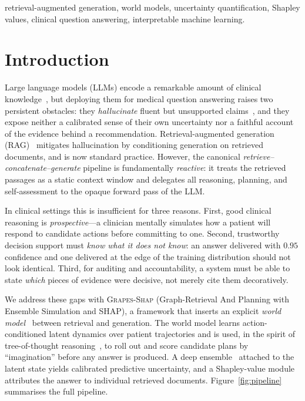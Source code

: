 \documentclass[conference]{IEEEtran}
\newcommand{\method}{\textsc{Grapes-Shap}}
\begin{document}
\begin{IEEEkeywords}
retrieval-augmented generation, world models, uncertainty quantification,
Shapley values, clinical question answering, interpretable machine learning.
\end{IEEEkeywords}

\section{Introduction}
Large language models (LLMs) encode a remarkable amount of clinical
knowledge~\cite{singhal2023medpalm}, but deploying them for medical question
answering raises two persistent obstacles: they \emph{hallucinate} fluent
but unsupported claims~\cite{ji2023hallucination}, and they expose neither a
calibrated sense of their own uncertainty nor a faithful account of the
evidence behind a recommendation. Retrieval-augmented generation
(RAG)~\cite{lewis2020rag} mitigates hallucination by conditioning generation
on retrieved documents, and is now standard practice. However, the canonical
\emph{retrieve--concatenate--generate} pipeline is fundamentally
\emph{reactive}: it treats the retrieved passages as a static context window
and delegates all reasoning, planning, and self-assessment to the opaque
forward pass of the LLM.

In clinical settings this is insufficient for three reasons. First, good
clinical reasoning is \emph{prospective}---a clinician mentally simulates how
a patient will respond to candidate actions before committing to one. Second,
trustworthy decision support must \emph{know what it does not know}: an answer
delivered with $0.95$ confidence and one delivered at the edge of the
training distribution should not look identical. Third, for auditing and
accountability, a system must be able to state \emph{which} pieces of evidence
were decisive, not merely cite them decoratively.

We address these gaps with \method{} (Graph-Retrieval And Planning with
Ensemble Simulation and SHAP), a framework that inserts an explicit
\emph{world model}~\cite{ha2018worldmodels,hafner2020dreamer} between
retrieval and generation. The world model learns action-conditioned latent
dynamics over patient trajectories and is used, in the spirit of
tree-of-thought reasoning~\cite{yao2023tot}, to roll out and score candidate
plans by ``imagination'' before any answer is produced. A deep
ensemble~\cite{lakshminarayanan2017ensembles} attached to the latent state
yields calibrated predictive uncertainty, and a Shapley-value
module~\cite{lundberg2017shap,shapley1953value} attributes the answer to
individual retrieved documents. Figure~\ref{fig:pipeline} summarises the full
pipeline.
\end{document}
